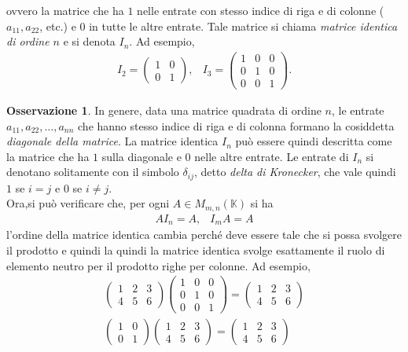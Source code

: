 \documentclass{book}
\theoremstyle{definition}
\newtheorem{oss}{Osservazione}[section]
\theoremstyle{plain}
\begin{document}
ovvero la matrice che ha $1$ nelle entrate con stesso indice di riga e di colonne ($a_{11},a_{22}$, etc.) e 0
in tutte le altre entrate. Tale matrice si chiama \textit{matrice identica di ordine $n$} e si denota $I_n$.
Ad esempio,
\begin{eqnarray*}
  I_2=
  \begin{pmatrix}
    1 & 0\\
    0 & 1
  \end{pmatrix}, & I_3=
                   \begin{pmatrix}
                     1 & 0 & 0\\
                     0 & 1 & 0\\
                     0 & 0 & 1
                   \end{pmatrix}.
\end{eqnarray*}
\begin{oss}
  \label{oss:Compinveeproddimatrici3}
  In genere, data una matrice quadrata di ordine $n$, le entrate $a_{11},a_{22},\dots,a_{nn}$ che hanno stesso
  indice di riga e di colonna formano la cosiddetta \textit{diagonale della matrice}. La matrice identica
  $I_n$ può essere quindi descritta come la matrice che ha $1$ sulla diagonale e $0$ nelle altre entrate.
  Le entrate di $I_n$ si denotano solitamente con il simbolo $\delta_{ij}$, detto \textit{delta di
    Kronecker}, che vale quindi $1$ se $i=j$ e 0 se $i\neq j$.\\
  Ora,si può verificare che, per ogni $A\in M_{m,n}(\mathds{K})$ si ha
  \begin{eqnarray*}
    AI_n=A, & I_mA=A
  \end{eqnarray*}
  l'ordine della matrice identica cambia perché deve essere tale che si possa svolgere il prodotto e quindi
  la quindi la matrice identica svolge esattamente il ruolo di elemento neutro per il prodotto righe per
  colonne. Ad esempio,
  \begin{eqnarray*}
    \begin{pmatrix}
      1 & 2 & 3\\
      4 & 5 & 6 
    \end{pmatrix}
    \begin{pmatrix}
      1 & 0 & 0\\
      0 & 1 & 0\\
      0 & 0 & 1
    \end{pmatrix}=
    \begin{pmatrix}
      1 & 2 & 3\\
      4 & 5 & 6
    \end{pmatrix}\\
    \begin{pmatrix}
      1 & 0 \\
      0 & 1
    \end{pmatrix}
    \begin{pmatrix}
      1 & 2 & 3\\
      4 & 5 & 6 
    \end{pmatrix}=
    \begin{pmatrix}
      1 & 2 & 3\\
      4 & 5 & 6
    \end{pmatrix}
  \end{eqnarray*}
\end{oss}
\end{document}
